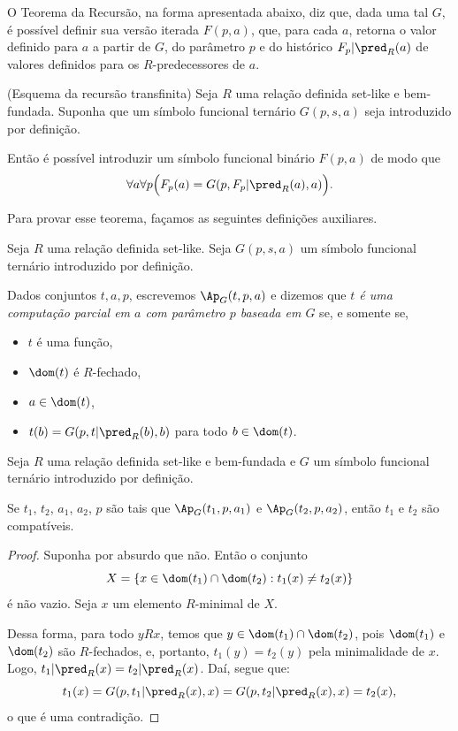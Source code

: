 O Teorema da Recursão, na forma apresentada abaixo, diz que, dada uma tal $G$, é possível definir sua versão iterada $F(p, a)$, que, para cada $a$, retorna o valor definido para $a$ a partir de $G$, do parâmetro $p$ e do histórico $F_p|\pred_{R}(a)$ de valores definidos para os $R$-predecessores de $a$.

\begin{theoremDisplay}[$\ZFmP$](Esquema da recursão transfinita)
    Seja $R$ uma relação definida set-like e bem-fundada.
    Suponha que um símbolo funcional ternário $G(p, s, a)$ seja introduzido por definição.

    Então é possível introduzir um símbolo funcional binário $F(p, a)$ de modo que
    \[
        \forall a \forall p \Big( F_{p}(a)=G(p, F_p|\pred_{R}(a), a)\Big).
    \]
\end{theoremDisplay}
Para provar esse teorema, façamos as seguintes definições auxiliares.

\begin{definition}[$\ZFmP$]
    Seja $R$ uma relação definida set-like.
    Seja $G(p, s, a)$ um símbolo funcional ternário introduzido por definição.

    Dados conjuntos $t, a, p$, escrevemos $\Ap_G(t, p, a)$ e dizemos que \emph{$t$ é uma computação parcial em $a$ com parâmetro $p$ baseada em $G$} se, e somente se,
    \begin{itemize}
        \item $t$ é uma função,
        \item $\dom(t)$ é $R$-fechado,
        \item $a \in \dom(t)$,
        \item $t(b)=G(p, t|\pred_{R}(b), b)$ para todo $b\in \dom(t)$.
    \end{itemize}
\end{definition}

\begin{lemma}[$\ZFmP$]\label{lem:compatibilidadeComputacoesParciais}
    Seja $R$ uma relação definida set-like e bem-fundada e $G$ um símbolo funcional ternário introduzido por definição.

    Se $t_1$, $t_2$, $a_1$, $a_2$, $p$ são tais que $\Ap_G(t_1, p, a_1)$ e $\Ap_G(t_2, p, a_2)$, então $t_1$ e $t_2$ são compatíveis.
\end{lemma}
\begin{proof}
    Suponha por absurdo que não.
    Então o conjunto
    \[
        X=\{x\in \dom(t_1)\cap \dom(t_2): t_1(x)\neq t_2(x)\}
    \]
    é não vazio.
    Seja $x$ um elemento $R$-minimal de $X$.

    Dessa forma, para todo $y R x$, temos que $y\in \dom(t_1)\cap \dom(t_2)$, pois $\dom(t_1)$ e $\dom(t_2)$ são $R$-fechados, e, portanto, $t_1(y)=t_2(y)$ pela minimalidade de $x$.
    Logo, $t_1|\pred_{R}(x)=t_2|\pred_{R}(x)$.
    Daí, segue que:
    \[
        t_1(x)=G(p, t_1|\pred_{R}(x), x)=G(p, t_2|\pred_{R}(x), x)=t_2(x),
    \]
    o que é uma contradição.
\end{proof}

